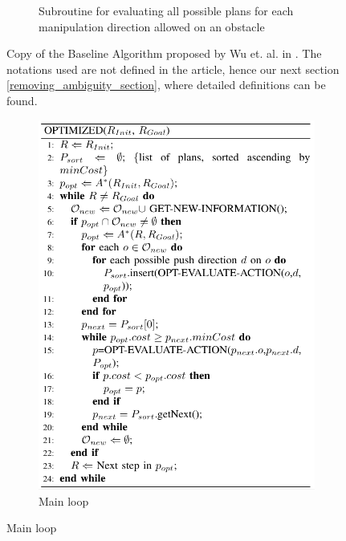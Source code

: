 \begin{figure}[H]
\begin{subfigure}{.45\textwidth}
  \caption{Subroutine for evaluating all possible plans for each manipulation direction allowed on an obstacle}
  \label{fig:Wu_Original_Algorithm-algo2}
\end{subfigure}
\caption{Copy of the Baseline Algorithm proposed by Wu et. al. in \parencite{wu_navigation_2010}. The notations used are not defined in the article, hence our next section \ref{removing_ambiguity_section}, where detailed definitions can be found.}
\label{fig:Wu_Original_Algorithm-baseline}
\end{figure}

\begin{figure}[H]
\centering
\begin{subfigure}{.45\textwidth}
  \centering
  \includegraphics[width=\linewidth]{Figures/Wu_Original_Algorithm/algo3.png}
  \caption{Main loop}
  \label{fig:Wu_Original_Algorithm-algo3}
\end{subfigure}\hspace*{\fill}

\end{figure}

